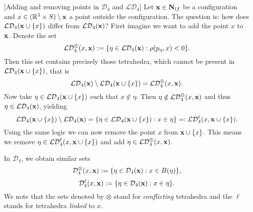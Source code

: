 


\begin{remark}\label{r:addremove}[Adding and removing points in $\mathcal D_4$ and $\mathcal {LD}_4$]
	Let ${\mathbf{x}}\in \mathbf N_{lf}$ be a configuration and $x\in({\mathbb R^3} \times S) \setminus {\mathbf{x}}$ a point outside the configuration. The question is: how does $\mathcal {LD}_4({\mathbf{x}} \cup \{x\})$ differ from $\mathcal {LD}_4({\mathbf{x}})$?
	First imagine we want to add the point $x$ to ${\mathbf{x}}$. Denote the set 
	$$\mathcal {LD}_4^\otimes(x,{\mathbf{x}}) := \{\eta \in \mathcal {LD}_4({\mathbf{x}}): \rho(p_\eta,x) < 0\}.$$
	Then this set contains precisely those tetrahedra, which cannot be present in $\mathcal {LD}_4({\mathbf{x}} \cup \{x\})$, that is
	$$ \mathcal {LD}_4 ({\mathbf{x}}) \setminus \mathcal {LD}_4({\mathbf{x}} \cup \{x\}) = \mathcal {LD}_4^\otimes(x,{\mathbf{x}}).$$
	Now take $\eta \in \mathcal {LD}_4({\mathbf{x}} \cup \{x\})$ such that $x \notin \eta$. Then $\eta \notin \mathcal {LD}_4^\otimes(x,{\mathbf{x}})$ and thus $\eta \in \mathcal {LD}_4({\mathbf{x}})$, yielding
	$$\mathcal {LD}_4 ({\mathbf{x}} \cup \{x\}) \setminus \mathcal {LD}_4({\mathbf{x}}) = \{ \eta \in \mathcal {LD}_4({\mathbf{x}}\cup\{x\}): x \in \eta\} =: \mathcal {LD}_4^\ell(x, {\mathbf{x}} \cup \{x\}).$$
	Using the same logic we can now remove the point $x$ from ${\mathbf{x}} \cup \{x\}$. This means we remove $\eta \in \mathcal {LD}_4^\ell(x,{\mathbf{x}}\cup\{x\})$ and add $\eta \in \mathcal {LD}_4^\otimes(x,{\mathbf{x}})$.\newline

	\noindent In $\mathcal D_4$, we obtain similar sets
	$$\mathcal D_4^\otimes(x,{\mathbf{x}}) := \{\eta \in \mathcal D_4({\mathbf{x}}): x \in B(\eta)\},$$
	$$\mathcal D_4^\ell(x,{\mathbf{x}}) := \{\eta \in \mathcal D_4({\mathbf{x}}): x\in \eta \}.$$
	We note that the sets denoted by $\otimes$ stand for \textit{conflicting} tetrahedra and the $\ell$ stands for tetrahedra \textit{linked} to $x$. 

\end{remark}
